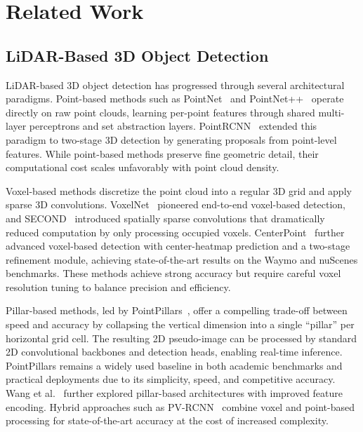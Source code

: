 \documentclass[sustainability,article,submit,moreauthors,pdftex]{Definitions/mdpi}
\begin{document}
\section{Related Work}\label{sec:related}

\subsection{LiDAR-Based 3D Object Detection}

LiDAR-based 3D object detection has progressed through several architectural paradigms. Point-based methods such as PointNet~\cite{qi2017pointnet} and PointNet++~\cite{qi2017pointnet++} operate directly on raw point clouds, learning per-point features through shared multi-layer perceptrons and set abstraction layers. PointRCNN~\cite{shi2019pointrcnn} extended this paradigm to two-stage 3D detection by generating proposals from point-level features. While point-based methods preserve fine geometric detail, their computational cost scales unfavorably with point cloud density.

Voxel-based methods discretize the point cloud into a regular 3D grid and apply sparse 3D convolutions. VoxelNet~\cite{zhou2018voxelnet} pioneered end-to-end voxel-based detection, and SECOND~\cite{yan2018second} introduced spatially sparse convolutions that dramatically reduced computation by only processing occupied voxels. CenterPoint~\cite{yin2021centerpoint} further advanced voxel-based detection with center-heatmap prediction and a two-stage refinement module, achieving state-of-the-art results on the Waymo and nuScenes benchmarks. These methods achieve strong accuracy but require careful voxel resolution tuning to balance precision and efficiency.

Pillar-based methods, led by PointPillars~\cite{lang2019pointpillars}, offer a compelling trade-off between speed and accuracy by collapsing the vertical dimension into a single ``pillar'' per horizontal grid cell. The resulting 2D pseudo-image can be processed by standard 2D convolutional backbones and detection heads, enabling real-time inference. PointPillars remains a widely used baseline in both academic benchmarks and practical deployments due to its simplicity, speed, and competitive accuracy. Wang et al.~\cite{wang2020pillar} further explored pillar-based architectures with improved feature encoding. Hybrid approaches such as PV-RCNN~\cite{shi2020pvrcnn} combine voxel and point-based processing for state-of-the-art accuracy at the cost of increased complexity.
\end{document}
